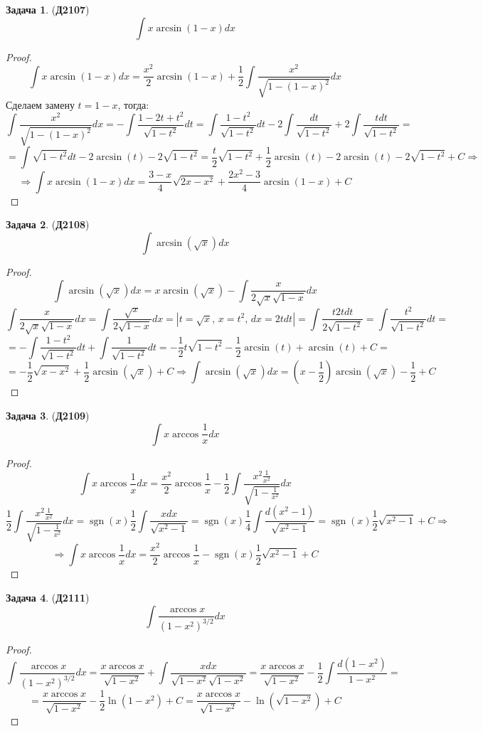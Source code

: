 \documentclass[12pt]{article}
\theoremstyle{definition}
\newtheorem{problem}{Задача}
\DeclareMathOperator{\sgn}{sgn}
\DeclareMathOperator{\dint}{\displaystyle\int}
\begin{document}
\begin{problem}(\textbf{Д2107})
	$$
		\dint x \arcsin(1-x)dx
	$$
\end{problem}
\begin{proof}
	$$
		\dint x \arcsin(1-x)dx = \dfrac{x^2}{2}\arcsin(1-x) + \dfrac{1}{2}\dint \dfrac{x^2}{\sqrt{1 - (1-x)^2}}dx
	$$
	Сделаем замену $t = 1 - x$, тогда:
	$$
		\dint \dfrac{x^2}{\sqrt{1 - (1-x)^2}}dx  = -\dint \dfrac{1 - 2t + t^2}{\sqrt{1 - t^2}}dt = \dint \dfrac{1 - t^2}{\sqrt{1-t^2}}dt - 2\dint\dfrac{dt}{\sqrt{1 - t^2}} + 2\dint\dfrac{tdt}{\sqrt{1-t^2}} = 
	$$
	$$
		= \dint \sqrt{1 - t^2}dt - 2\arcsin(t) - 2\sqrt{1-t^2}  = \dfrac{t}{2}\sqrt{1 - t^2} + \dfrac{1}{2}\arcsin(t) - 2\arcsin(t) - 2\sqrt{1-t^2} + C \Rightarrow
	$$
	$$
		\Rightarrow \dint x \arcsin(1-x)dx = \dfrac{3 -x}{4}\sqrt{2x - x^2} + \dfrac{2x^2 - 3}{4}\arcsin(1-x) + C
	$$
\end{proof}

\begin{problem}(\textbf{Д2108})
	$$
		\dint \arcsin{(\sqrt{x})}dx
	$$
\end{problem}
\begin{proof}
	$$
		\dint \arcsin{(\sqrt{x})}dx = x\arcsin{(\sqrt{x})} - \dint \dfrac{x}{2\sqrt{x}\sqrt{1-x}}dx 
	$$
	$$
		\dint \dfrac{x}{2\sqrt{x}\sqrt{1-x}}dx  = \dint\dfrac{\sqrt{x}}{2\sqrt{1-x}}dx = |t = \sqrt{x}, \, x = t^2, \, dx = 2tdt| = \dint \dfrac{t 2tdt}{2\sqrt{1 - t^2}} = \dint \dfrac{t^2}{\sqrt{1-t^2}}dt = 
	$$
	$$
		=	-\dint \dfrac{1-t^2}{\sqrt{1-t^2}}dt + \dint \dfrac{1}{\sqrt{1 - t^2}}dt = - \dfrac{1}{2}t\sqrt{1 - t^2} - \dfrac{1}{2}\arcsin(t) + \arcsin(t) + C = 
	$$
	$$
		=	-\dfrac{1}{2}\sqrt{x - x^2} + \dfrac{1}{2}\arcsin(\sqrt{x}) + C \Rightarrow \dint \arcsin{(\sqrt{x})}dx = \left(x - \dfrac{1}{2}\right)\arcsin(\sqrt{x}) - \dfrac{1}{2} + C
	$$
\end{proof}
\begin{problem}(\textbf{Д2109})
	$$
		\dint x\arccos\dfrac{1}{x}dx
	$$
\end{problem}
\begin{proof}
	$$
		\dint x\arccos\dfrac{1}{x}dx = \dfrac{x^2}{2}\arccos\dfrac{1}{x} - \dfrac{1}{2}\dint \dfrac{x^2 \tfrac{1}{x^2}}{\sqrt{1 - \tfrac{1}{x^2}}}dx
	$$
	$$
		\dfrac{1}{2}\dint \dfrac{x^2 \tfrac{1}{x^2}}{\sqrt{1 - \tfrac{1}{x^2}}}dx = \sgn(x)\dfrac{1}{2}\dint \dfrac{xdx}{\sqrt{x^2-1}} = \sgn(x)\dfrac{1}{4}\dint \dfrac{d(x^2 - 1)}{\sqrt{x^2 - 1}} = \sgn(x)\dfrac{1}{2}\sqrt{x^2 - 1} + C \Rightarrow
	$$
	$$
		\Rightarrow \dint x\arccos\dfrac{1}{x}dx = \dfrac{x^2}{2}\arccos\dfrac{1}{x} - \sgn(x)\dfrac{1}{2}\sqrt{x^2 - 1} + C
	$$
\end{proof}
\begin{problem}(\textbf{Д2111})
	$$
		\dint \dfrac{\arccos{x}}{(1 - x^2)^{3/2}}dx
	$$
\end{problem}
\begin{proof}
	$$
		\dint \dfrac{\arccos{x}}{(1 - x^2)^{3/2}}dx = \dfrac{x\arccos{x}}{\sqrt{1 - x^2}} + \dint \dfrac{xdx}{\sqrt{1 - x^2}\sqrt{1 - x^2}} = \dfrac{x\arccos{x}}{\sqrt{1 - x^2}}  - \dfrac{1}{2} \dint \dfrac{d(1 - x^2)}{1 -x^2}=
	$$
	$$
		=	\dfrac{x\arccos{x}}{\sqrt{1 - x^2}} - \dfrac{1}{2}\ln(1 -x^2) + C = \dfrac{x\arccos{x}}{\sqrt{1 - x^2}} - \ln(\sqrt{1 - x^2}) + C
	$$
\end{proof}
\end{document}
